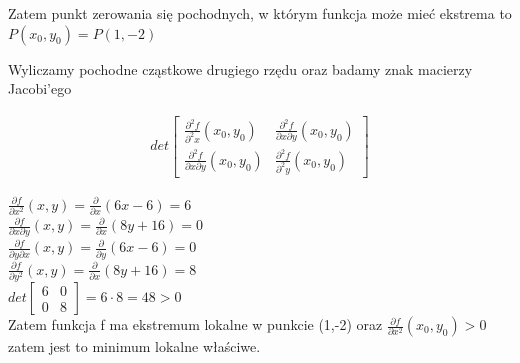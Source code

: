 \documentclass[12pt]{article}
\begin{document}
\begin{itemize}
            Zatem punkt zerowania się pochodnych, w którym funkcja może mieć ekstrema to $P(x_0,y_0) = P(1,-2)$
            
            Wyliczamy pochodne cząstkowe drugiego rzędu oraz badamy znak macierzy Jacobi'ego
            
            \begin{equation}
                \begin{aligned}
                det \begin{bmatrix}
                           \frac{\partial^2 f}{\partial^2 x}(x_0, y_0) & \frac{\partial^2 f}{\partial x \partial y}(x_0, y_0) \\
                           \frac{\partial^2 f}{\partial x \partial y}(x_0, y_0) & \frac{\partial^2 f}{\partial^2 y}(x_0, y_0)
                \end{bmatrix}
                                \end{aligned}
            \end{equation}
            \newpage
         
                 $\frac{\partial f}{\partial x^2} (x,y) = \frac{\partial}{\partial x} \left( 6x - 6 \right) = 6$
                 \\
                 
                $\frac{\partial f}{\partial x \partial y} (x,y)  =  \frac{\partial}{\partial x} \left( 8y + 16 \right) = 0$
                \\
                
                $\frac{\partial f}{\partial y \partial x} (x,y) = \frac{\partial}{\partial y} \left( 6x - 6 \right) = 0$
                \\
                
                $\frac{\partial f}{\partial y^2} (x,y)  = \frac{\partial}{\partial x} \left( 8y + 16 \right) = 8$
                \\
                
                $ det \begin{bmatrix}
                     6 & 0 \\
                     0 & 8
                    \end{bmatrix} = 6 \cdot 8 = 48 > 0$ \\
                    
                Zatem funkcja f ma ekstremum lokalne w punkcie (1,-2) oraz $\frac{\partial f}{\partial x^2}(x_0, y_0) > 0$ zatem jest to minimum lokalne właściwe.

        \end{itemize}
    \newpage
\end{document}
